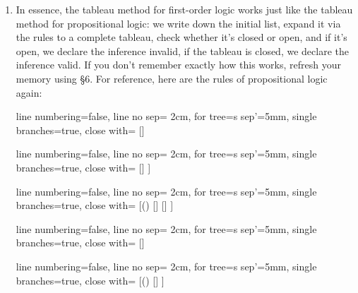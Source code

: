 	\begin{enumerate}[\thesection.1]

		\item In essence, the tableau method for first-order logic works just like the tableau method for propositional logic: we write down the initial list, expand it via the rules to a complete tableau, check whether it's closed or open, and if it's open, we declare the inference invalid, if the tableau is closed, we declare the inference valid. If you don't remember exactly how this works, refresh your memory using \S6. For reference, here are the rules of propositional logic again:
		
		\begin{center}
					
					\begin{prooftree}
					{
					line numbering=false,
					line no sep= 2cm,
					for tree={s sep'=5mm},
					single branches=true,
					close with=\xmark
					}
					[\neg\neg \phi [\phi ] ]
					\end{prooftree}
					\begin{prooftree}
					{
					line numbering=false,
					line no sep= 2cm,
					for tree={s sep'=5mm},
					single branches=true,
					close with=\xmark
					}
					[\phi\land\psi [\phi [\psi ] ] ]
					\end{prooftree}
					\begin{prooftree}
					{
					line numbering=false,
					line no sep= 2cm,
					for tree={s sep'=5mm},
					single branches=true,
					close with=\xmark
					}
					[\neg (\phi\land\psi) [\neg \phi ] [\neg \psi ] ]
					\end{prooftree}
					\begin{prooftree}
					{
					line numbering=false,
					line no sep= 2cm,
					for tree={s sep'=5mm},
					single branches=true,
					close with=\xmark
					}
					[\phi\lor\psi [\phi ] [\psi ] ]
					\end{prooftree}
					\begin{prooftree}
					{
					line numbering=false,
					line no sep= 2cm,
					for tree={s sep'=5mm},
					single branches=true,
					close with=\xmark
					}
					[\neg(\phi\lor\psi) [\neg\phi [\neg\psi ] ] ]
					\end{prooftree}

					\vspace{2ex}


\end{center}
\end{enumerate}
